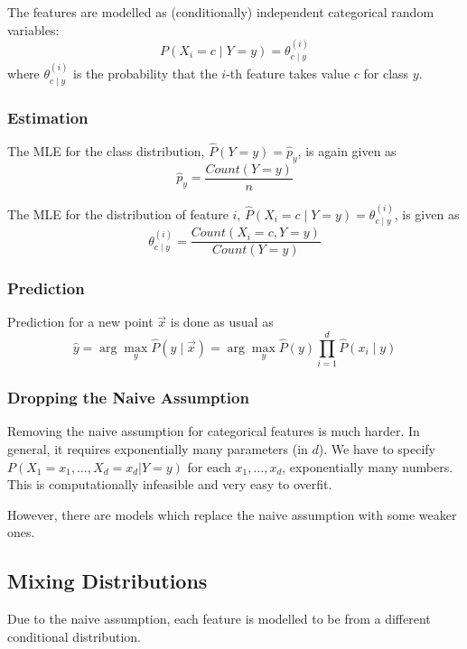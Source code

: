 The features are modelled as (conditionally)
independent categorical random variables:
\begin{equation*}
P(X_i = c \mid Y = y) = \theta^{(i)}_{c \mid y}
\end{equation*}
where $\theta^{(i)}_{c \mid y}$ is the
probability that the $i$-th feature
takes value $c$ for class $y$.

\subsubsection{Estimation}
The MLE for the class distribution,
$\hat{P}(Y = y) = \hat{p}_y$,
is again given as
\begin{equation*}
\hat{p}_y = \frac{Count(Y = y)}{n}
\end{equation*}

The MLE for the distribution of feature $i$,
$\hat{P}(X_i = c \mid Y = y) = \theta^{(i)}_{c \mid y}$,
is given as
\begin{equation*}
\theta^{(i)}_{c \mid y} =
\frac{Count(X_i = c, Y = y)}{Count(Y = y)}
\end{equation*}

\subsubsection{Prediction}
Prediction for a new point $\vec{x}$ is
done as usual as
\begin{equation*}
\hat{y} = \arg\max_y{\hat{P}(y \mid \vec{x})}
= \arg\max_y{
	\hat{P}(y) \prod_{i=1}^d{\hat{P}(x_i \mid y)}
}
\end{equation*}

\subsubsection{Dropping the Naive Assumption}
Removing the naive assumption for
categorical features is much harder.
In general,
it requires exponentially many parameters (in $d$).
We have to specify
$P(X_1 = x_1, \dotsc, X_d = x_d | Y = y)$ for each $x_1, \dotsc, x_d$,
exponentially many numbers.
This is computationally infeasible and very easy to overfit.

However, there are models which replace the naive
assumption with some weaker ones.


\subsection{Mixing Distributions}
Due to the naive assumption,
each feature is modelled to be from a
different conditional distribution.

